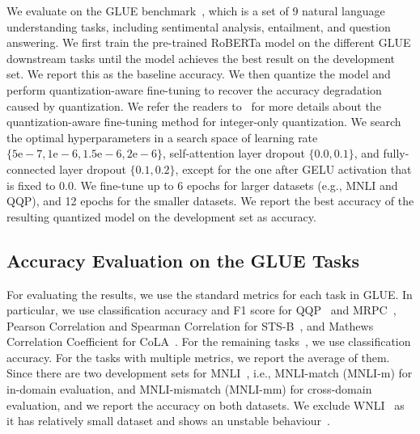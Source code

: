 We evaluate \OURS on the GLUE benchmark~\cite{wang2018glue},
which is a set of 9 natural language understanding tasks, including sentimental analysis, entailment, and question answering.
We first train the pre-trained RoBERTa model on the different GLUE downstream tasks until the model achieves the best result on the development set.
We report this as the baseline accuracy.
We then quantize the model and perform quantization-aware fine-tuning to recover the accuracy degradation caused by quantization.
We refer the readers to~\cite{yao2020hawqv3} for more details about the quantization-aware fine-tuning method for integer-only quantization.
We search the optimal hyperparameters in a search space of learning rate $\{5\mathrm{e}-7, 1\mathrm{e}-6, 1.5\mathrm{e}-6, 2\mathrm{e}-6\}$,
self-attention layer dropout $\{0.0, 0.1\}$, and fully-connected layer dropout $\{0.1, 0.2\}$, except for the one after GELU activation that is fixed to 0.0.
We fine-tune up to 6 epochs for larger datasets (e.g., MNLI and QQP), and 12 epochs for the smaller datasets.
We report the best accuracy of the resulting quantized model on the development set as \OURS accuracy.


\subsection{Accuracy Evaluation on the GLUE Tasks}
\label{appendix:accuracy_eval}
For evaluating the results, we use the standard metrics for each task in GLUE. 
In particular, we use classification accuracy and F1 score for QQP~\cite{iyer2017first} and MRPC~\cite{dolan2005automatically},
Pearson Correlation and Spearman Correlation for STS-B~\cite{cer2017semeval},
and Mathews Correlation Coefficient for CoLA~\cite{warstadt2019neural}.
For the remaining tasks~\cite{williams2017broad, rajpurkar2016squad, socher2013recursive, dagan2005pascal}, we use classification accuracy.
For the tasks with multiple metrics, we report the average of them.
Since there are two development sets for MNLI~\cite{williams2017broad}, i.e., MNLI-match (MNLI-m) for in-domain evaluation, and MNLI-mismatch (MNLI-mm) for cross-domain evaluation, and we report the accuracy on both datasets.
We exclude WNLI~\cite{levesque2012winograd} as it has relatively small dataset and shows an unstable behaviour~\cite{dodge2020fine}.  

